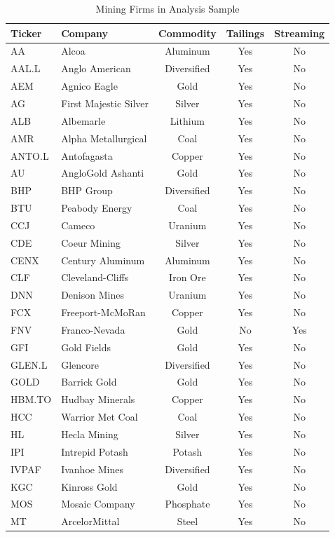 \documentclass[12pt]{article}
\begin{document}
\begin{table}[htbp]
\centering
\caption{Mining Firms in Analysis Sample}
\label{tab:firm_list}
\small
\begin{tabular}{llccc}
\toprule
Ticker & Company & Commodity & Tailings & Streaming \\
\midrule
AA & Alcoa & Aluminum & Yes & No \\
AAL.L & Anglo American & Diversified & Yes & No \\
AEM & Agnico Eagle & Gold & Yes & No \\
AG & First Majestic Silver & Silver & Yes & No \\
ALB & Albemarle & Lithium & Yes & No \\
AMR & Alpha Metallurgical & Coal & Yes & No \\
ANTO.L & Antofagasta & Copper & Yes & No \\
AU & AngloGold Ashanti & Gold & Yes & No \\
BHP & BHP Group & Diversified & Yes & No \\
BTU & Peabody Energy & Coal & Yes & No \\
CCJ & Cameco & Uranium & Yes & No \\
CDE & Coeur Mining & Silver & Yes & No \\
CENX & Century Aluminum & Aluminum & Yes & No \\
CLF & Cleveland-Cliffs & Iron Ore & Yes & No \\
DNN & Denison Mines & Uranium & Yes & No \\
FCX & Freeport-McMoRan & Copper & Yes & No \\
FNV & Franco-Nevada & Gold & No & Yes \\
GFI & Gold Fields & Gold & Yes & No \\
GLEN.L & Glencore & Diversified & Yes & No \\
GOLD & Barrick Gold & Gold & Yes & No \\
HBM.TO & Hudbay Minerals & Copper & Yes & No \\
HCC & Warrior Met Coal & Coal & Yes & No \\
HL & Hecla Mining & Silver & Yes & No \\
IPI & Intrepid Potash & Potash & Yes & No \\
IVPAF & Ivanhoe Mines & Diversified & Yes & No \\
KGC & Kinross Gold & Gold & Yes & No \\
MOS & Mosaic Company & Phosphate & Yes & No \\
MT & ArcelorMittal & Steel & Yes & No \\

\end{tabular}
\end{table}
\end{document}
